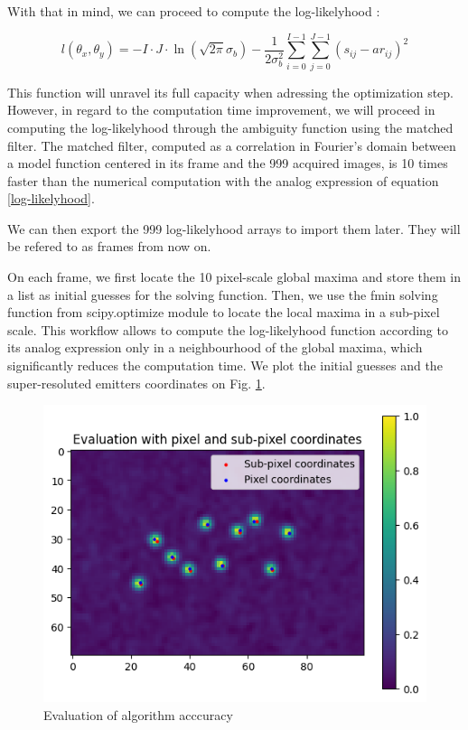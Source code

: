 \documentclass[10pt,letterpaper]{article}
\begin{document}
With that in mind, we can proceed to compute the log-likelyhood :

\begin{equation} \label{log-likelyhood}
     l\left(\theta_x, \theta_y\right)=-I \cdot J \cdot \ln \left(\sqrt{2 \pi} \sigma_b\right)-\frac{1}{2 \sigma_b^2} \sum_{i=0}^{I-1} \sum_{j=0}^{J-1}\left(s_{i j}-a r_{i j}\right)^2
\end{equation}

This function will unravel its full capacity when adressing the optimization step. However, in regard to the computation time improvement, we will proceed in computing the log-likelyhood through the ambiguity function using the matched filter. The matched filter, computed as a correlation in Fourier's domain between a model function centered in its frame and the 999 acquired images, is 10 times faster than the numerical computation with the analog expression of equation \ref{log-likelyhood}.

We can then export the 999 log-likelyhood arrays to import them later. They will be refered to as frames from now on.

On each frame, we first locate the 10 pixel-scale global maxima and store them in a list as initial guesses for the solving function. Then, we use the fmin solving function from scipy.optimize module to locate the local maxima in a sub-pixel scale. This workflow allows to compute the log-likelyhood function according to its analog expression only in a neighbourhood of the global maxima, which significantly reduces the computation time. We plot the initial guesses and the super-resoluted emitters coordinates on Fig. \ref{fig:eval}.


\begin{figure}[h]
	\centering
	\includegraphics[scale=0.65]{evaluation of algo.png}
	\caption{Evaluation of algorithm acccuracy}
	\label{fig:eval}
\end{figure}
\end{document}
